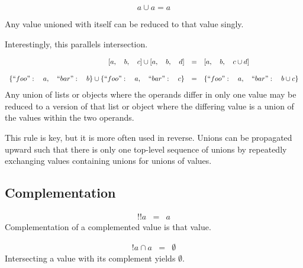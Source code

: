 \documentclass[letterpaper]{article}
\begin{document}
\begin{prule}
\begin{equation}
a\cup a = a
\end{equation}

Any value unioned with itself can be reduced to that value singly.
\end{prule}

Interestingly, this parallels intersection.

\begin{prule}
\label{sec:objuniondist}
\begin{equation}
\begin{array}{rcl}

{[}a,\quad b,\quad c] \cup {[}a,\quad b,\quad d] &=& {[}a,\quad b,\quad c \cup d] \\
\\
\{``foo":\quad a,\quad``bar":\quad b\} \cup \{``foo":\quad a,\quad``bar":\quad c\}
&=& \{``foo":\quad a,\quad``bar":\quad b \cup c\}

\end{array}
\end{equation}
Any union of lists or objects where the operands  differ in only one value may
be reduced to a version of that list or object where the differing value is a
union of the values within the two operands.
\end{prule}

This rule is key, but it is more often used in reverse. Unions can be
propagated upward such that there is only one top-level sequence of unions by
repeatedly exchanging values containing unions for unions of values.

\subsection{Complementation}
\begin{prule}
\label{sec:compelim}
\begin{equation}
\begin{array}{rcl}
	!!a &=& a
\end{array}
\end{equation}
Complementation of a complemented value is that value.
\end{prule}

\begin{prule}
\begin{equation}
\begin{array}{rcl}
	!a \cap a &=& \emptyset
\end{array}
\end{equation}
Intersecting a value with its complement yields \(\emptyset\).
\end{prule}
\end{document}
